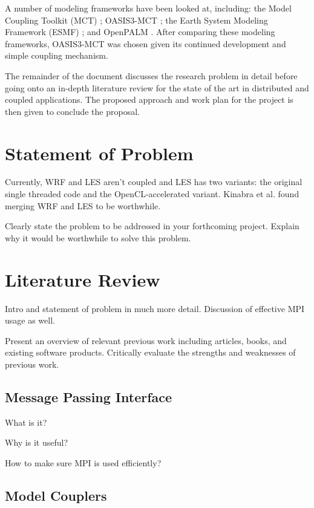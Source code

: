 \documentclass[a4paper,twocolumn,10pt]{article}
\begin{document}
A number of modeling frameworks have been looked at, including: the Model
Coupling Toolkit (MCT) \cite{Larson2005}; OASIS3-MCT \cite{Valcke,Valcke2013};
the Earth System Modeling Framework (ESMF) \cite{Ramework2004}; and OpenPALM
\cite{Piacentini2011}. After comparing these modeling frameworks, OASIS3-MCT was
chosen given its continued development and simple coupling mechanism.

The remainder of the document discusses the research problem in detail before
going onto an in-depth literature review for the state of the art in distributed
and coupled applications. The proposed approach and work plan for the project is
then given to conclude the proposal.

\section*{Statement of Problem}

Currently, WRF and LES aren't coupled and LES has two variants: the original
single threaded code and the OpenCL-accelerated variant. Kinabra et al.
\cite{Kinbara2010} found merging WRF and LES to be worthwhile.

Clearly state the problem to be addressed in your forthcoming project. Explain
why it would be worthwhile to solve this problem.

\section*{Literature Review}

Intro and statement of problem in much more detail. Discussion of effective MPI
usage as well.

Present an overview of relevant previous work including articles, books, and
existing software products. Critically evaluate the strengths and weaknesses of
previous work.

\subsection*{Message Passing Interface}

What is it?

Why is it useful?

How to make sure MPI is used efficiently?

\subsection*{Model Couplers}
\end{document}
